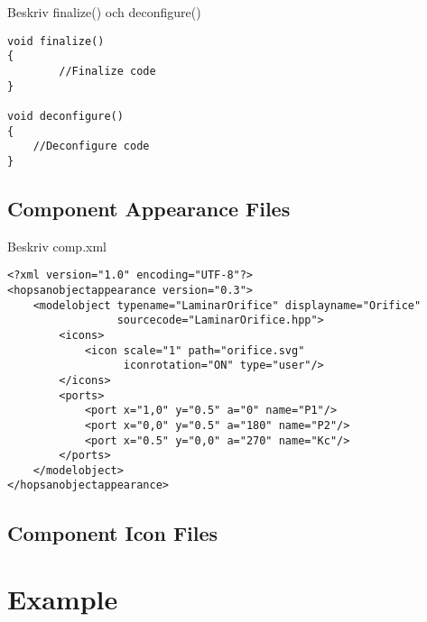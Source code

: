 \documentclass[a4paper,pdftex]{article}
\begin{document}
Beskriv finalize() och deconfigure()

\begin{minipage}{\linewidth}
\begin{lstlisting}[basicstyle=\footnotesize\ttfamily]
void finalize()
{
      	//Finalize code
}

void deconfigure()
{
    //Deconfigure code
}
\end{lstlisting}
\end{minipage}

\subsection*{Component Appearance Files}
Beskriv comp.xml

\begin{minipage}{\linewidth}
\begin{lstlisting}[basicstyle=\small\ttfamily]
<?xml version="1.0" encoding="UTF-8"?>
<hopsanobjectappearance version="0.3">
    <modelobject typename="LaminarOrifice" displayname="Orifice" 
                 sourcecode="LaminarOrifice.hpp">
        <icons>
            <icon scale="1" path="orifice.svg" 
                  iconrotation="ON" type="user"/>
        </icons>
        <ports>
            <port x="1,0" y="0.5" a="0" name="P1"/>
            <port x="0,0" y="0.5" a="180" name="P2"/>
            <port x="0.5" y="0,0" a="270" name="Kc"/>
        </ports>
    </modelobject>
</hopsanobjectappearance>
\end{lstlisting}
\end{minipage}


\subsection*{Component Icon Files}

\section{Example}
\end{document}
